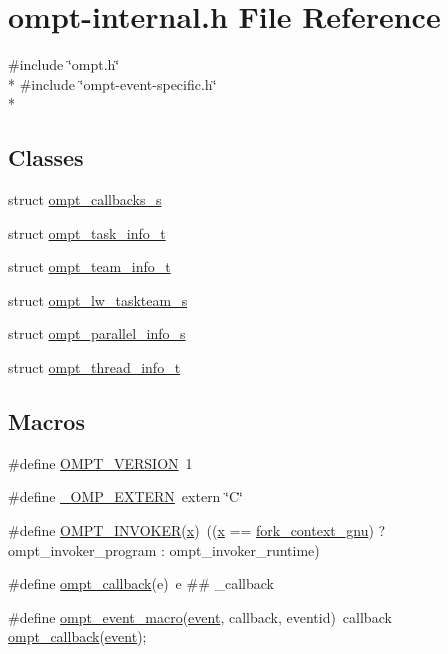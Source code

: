 \hypertarget{ompt-internal_8h}{\section{ompt-\/internal.h File Reference}
\label{ompt-internal_8h}
}
{\ttfamily \#include \char`\"{}ompt.\-h\char`\"{}}\\*
{\ttfamily \#include \char`\"{}ompt-\/event-\/specific.\-h\char`\"{}}\\*
\subsection*{Classes}
\begin{DoxyCompactItemize}
\item 
struct \hyperlink{structompt__callbacks__s}{ompt\-\_\-callbacks\-\_\-s}
\item 
struct \hyperlink{structompt__task__info__t}{ompt\-\_\-task\-\_\-info\-\_\-t}
\item 
struct \hyperlink{structompt__team__info__t}{ompt\-\_\-team\-\_\-info\-\_\-t}
\item 
struct \hyperlink{structompt__lw__taskteam__s}{ompt\-\_\-lw\-\_\-taskteam\-\_\-s}
\item 
struct \hyperlink{structompt__parallel__info__s}{ompt\-\_\-parallel\-\_\-info\-\_\-s}
\item 
struct \hyperlink{structompt__thread__info__t}{ompt\-\_\-thread\-\_\-info\-\_\-t}
\end{DoxyCompactItemize}
\subsection*{Macros}
\begin{DoxyCompactItemize}
\item 
\#define \hyperlink{ompt-internal_8h_a4e561a0866f90ea0738fae3c0a70d066}{O\-M\-P\-T\-\_\-\-V\-E\-R\-S\-I\-O\-N}~1
\item 
\#define \hyperlink{ompt-internal_8h_a38f674d2e88b164fc8720e326d39fb15}{\-\_\-\-O\-M\-P\-\_\-\-E\-X\-T\-E\-R\-N}~extern \char`\"{}C\char`\"{}
\item 
\#define \hyperlink{ompt-internal_8h_a0afe14fdda6f1478f12e6dd2e754e3af}{O\-M\-P\-T\-\_\-\-I\-N\-V\-O\-K\-E\-R}(\hyperlink{ittnotify__static_8h_a25eb27b280775b27a5ddc4d1673225aa}{x})~((\hyperlink{ittnotify__static_8h_a25eb27b280775b27a5ddc4d1673225aa}{x} == \hyperlink{kmp_8h_a49ed6f7454c18058b488af399cadd8e0a58c5bad04e427f0063bb39d20405a18c}{fork\-\_\-context\-\_\-gnu}) ? ompt\-\_\-invoker\-\_\-program \-: ompt\-\_\-invoker\-\_\-runtime)
\item 
\#define \hyperlink{ompt-internal_8h_aba7498009c87caa172c81113aee899e8}{ompt\-\_\-callback}(e)~e \#\# \-\_\-callback
\item 
\#define \hyperlink{ompt-internal_8h_a2fad586727e2dd81c1aa1dd101fc22f6}{ompt\-\_\-event\-\_\-macro}(\hyperlink{ittnotify__static_8h_a67bfbc8333e927ea068b74b6176097f2}{event}, callback, eventid)~callback \hyperlink{ompt-internal_8h_aba7498009c87caa172c81113aee899e8}{ompt\-\_\-callback}(\hyperlink{ittnotify__static_8h_a67bfbc8333e927ea068b74b6176097f2}{event});
\end{DoxyCompactItemize}
